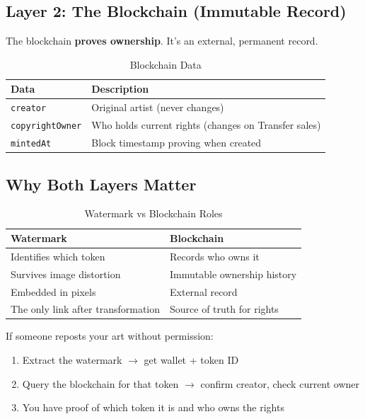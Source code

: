 \documentclass[11pt,a4paper]{article}
\newcommand{\code}[1]{\texttt{#1}}
\begin{document}
\subsection{Layer 2: The Blockchain (Immutable Record)}

The blockchain \textbf{proves ownership}. It's an external, permanent record.

\begin{table}[h]
\centering
\begin{tabular}{@{}ll@{}}
\toprule
\textbf{Data} & \textbf{Description} \\
\midrule
\code{creator} & Original artist (never changes) \\
\code{copyrightOwner} & Who holds current rights (changes on Transfer sales) \\
\code{mintedAt} & Block timestamp proving when created \\
\bottomrule
\end{tabular}
\caption{Blockchain Data}
\end{table}

\subsection{Why Both Layers Matter}

\begin{table}[h]
\centering
\begin{tabular}{@{}ll@{}}
\toprule
\textbf{Watermark} & \textbf{Blockchain} \\
\midrule
Identifies which token & Records who owns it \\
Survives image distortion & Immutable ownership history \\
Embedded in pixels & External record \\
The only link after transformation & Source of truth for rights \\
\bottomrule
\end{tabular}
\caption{Watermark vs Blockchain Roles}
\end{table}

If someone reposts your art without permission:

\begin{enumerate}
    \item Extract the watermark $\rightarrow$ get wallet + token ID
    \item Query the blockchain for that token $\rightarrow$ confirm creator, check current owner
    \item You have proof of which token it is and who owns the rights
\end{enumerate}
\end{document}
